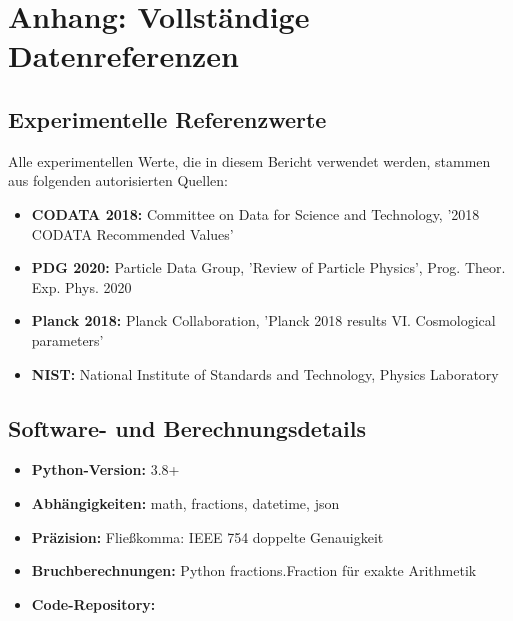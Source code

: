 	\section{Anhang: Vollständige Datenreferenzen}
	
	\subsection{Experimentelle Referenzwerte}
	
	Alle experimentellen Werte, die in diesem Bericht verwendet werden, stammen aus folgenden autorisierten Quellen:
	
	\begin{itemize}
		\item \textbf{CODATA 2018:} Committee on Data for Science and Technology, '2018 CODATA Recommended Values'
		\item \textbf{PDG 2020:} Particle Data Group, 'Review of Particle Physics', Prog. Theor. Exp. Phys. 2020
		\item \textbf{Planck 2018:} Planck Collaboration, 'Planck 2018 results VI. Cosmological parameters'
		\item \textbf{NIST:} National Institute of Standards and Technology, Physics Laboratory
	\end{itemize}
	
	\subsection{Software- und Berechnungsdetails}
	
	\begin{itemize}
		\item \textbf{Python-Version:} 3.8+
		\item \textbf{Abhängigkeiten:} math, fractions, datetime, json
		\item \textbf{Präzision:} Fließkomma: IEEE 754 doppelte Genauigkeit
		\item \textbf{Bruchberechnungen:} Python fractions.Fraction für exakte Arithmetik
		\item \textbf{Code-Repository:} 
	\end{itemize}
